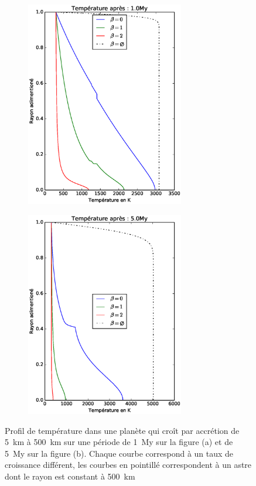 \documentclass[10pt,a4paper]{article}
\numberwithin{equation}{section}
\begin{document}
\begin{figure}[h!]
\centering
\begin{subfigure}{.5\textwidth}
  \centering
  \includegraphics[height=9cm]{./figures/graph_sim2_fig2_1.eps}
  \caption{}
  \label{fig2:1}
\end{subfigure}%
\begin{subfigure}{.5\textwidth}
  \centering
  \includegraphics[height=9cm]{./figures/graph_sim2_fig2_2.eps}
  \caption{}
  \label{fig2:2}
\end{subfigure}
\caption{Profil de température dans une planète qui croît par accrétion de \SI{5}{km} à \SI{500}{km} sur une période de \SI{1}{My} sur la figure (a) et de \SI{5}{My} sur la figure (b). Chaque courbe correspond à un taux de croissance différent, les courbes en pointillé  correspondent à un astre dont le rayon est constant à \SI{500}{km} }
\label{fig2}
\end{figure}
\end{document}

